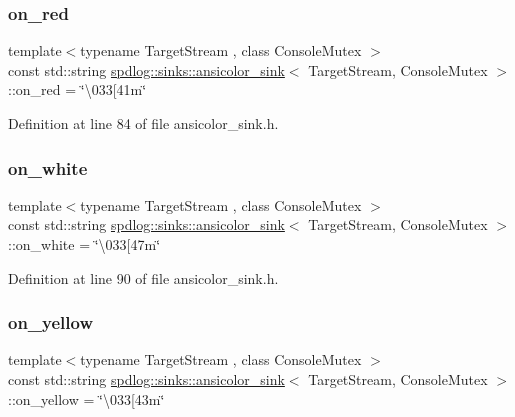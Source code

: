 \subsubsection{\texorpdfstring{on\+\_\+red}{on\_red}}
{\footnotesize\ttfamily template$<$typename Target\+Stream , class Console\+Mutex $>$ \\
const std\+::string \hyperlink{classspdlog_1_1sinks_1_1ansicolor__sink}{spdlog\+::sinks\+::ansicolor\+\_\+sink}$<$ Target\+Stream, Console\+Mutex $>$\+::on\+\_\+red = \char`\"{}\textbackslash{}033\mbox{[}41m\char`\"{}}



Definition at line 84 of file ansicolor\+\_\+sink.\+h.

\mbox{\label{classspdlog_1_1sinks_1_1ansicolor__sink_ab42fb978ba2ad9d004bf31903f0d0edc}} 
\subsubsection{\texorpdfstring{on\+\_\+white}{on\_white}}
{\footnotesize\ttfamily template$<$typename Target\+Stream , class Console\+Mutex $>$ \\
const std\+::string \hyperlink{classspdlog_1_1sinks_1_1ansicolor__sink}{spdlog\+::sinks\+::ansicolor\+\_\+sink}$<$ Target\+Stream, Console\+Mutex $>$\+::on\+\_\+white = \char`\"{}\textbackslash{}033\mbox{[}47m\char`\"{}}



Definition at line 90 of file ansicolor\+\_\+sink.\+h.

\mbox{\label{classspdlog_1_1sinks_1_1ansicolor__sink_a7450ec0f85ad82c7830b11e1f54f1606}} 
\subsubsection{\texorpdfstring{on\+\_\+yellow}{on\_yellow}}
{\footnotesize\ttfamily template$<$typename Target\+Stream , class Console\+Mutex $>$ \\
const std\+::string \hyperlink{classspdlog_1_1sinks_1_1ansicolor__sink}{spdlog\+::sinks\+::ansicolor\+\_\+sink}$<$ Target\+Stream, Console\+Mutex $>$\+::on\+\_\+yellow = \char`\"{}\textbackslash{}033\mbox{[}43m\char`\"{}}



